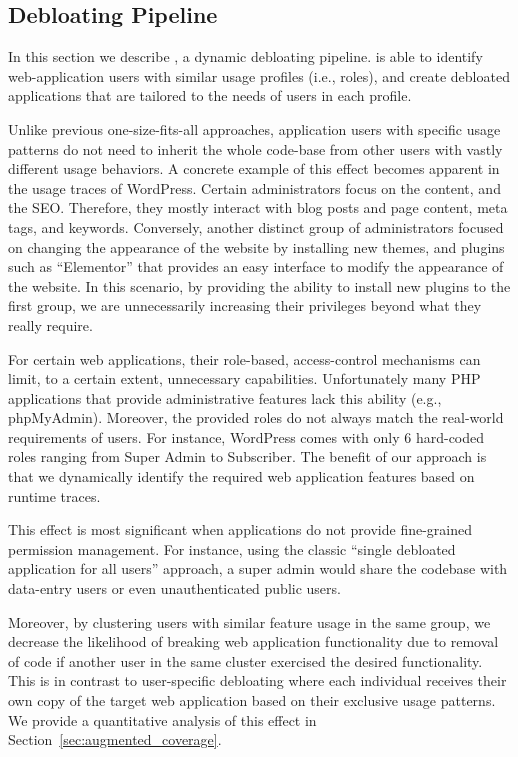 \subsection{Debloating Pipeline}

In this section we describe \sys{}, a dynamic debloating pipeline. 
\sys{} is able to identify web-application users with similar usage profiles (i.e., roles), and create debloated applications that are tailored to the needs of users in each profile. 


Unlike previous one-size-fits-all approaches, application users with specific usage patterns do not need to inherit the whole code-base from other users with vastly different usage behaviors. 
A concrete example of this effect becomes apparent in the usage traces of WordPress. 
Certain administrators focus on the content, and the SEO. 
Therefore, they mostly interact with blog posts and page content, meta tags, and keywords. 
Conversely, another distinct group of administrators focused on changing the appearance of the website by installing new themes, and plugins such as ``Elementor'' that provides an easy interface to modify the appearance of the website. 
In this scenario, by providing the ability to install new plugins to the first group, we are unnecessarily increasing their privileges beyond what they really require. 

For certain web applications, their role-based, access-control mechanisms can limit, to a certain extent, unnecessary capabilities.
Unfortunately many PHP applications that provide administrative features lack this ability (e.g., phpMyAdmin). 
Moreover, the provided roles do not always match the real-world requirements of users. For instance, WordPress comes with only 6 hard-coded roles ranging from Super Admin to Subscriber. 
The benefit of our approach is that we dynamically identify the required web application features based on runtime traces. 

This effect is most significant when applications do not provide fine-grained permission management. 
For instance, using the classic ``single debloated application for all users'' approach, a super admin would share the codebase with data-entry users or even unauthenticated public users. 

Moreover, by clustering users with similar feature usage in the same group, we decrease the likelihood of breaking web application functionality due to removal of code if another user in the same cluster exercised the desired functionality. 
This is in contrast to user-specific debloating where each individual receives their own copy of the target web application based on their exclusive usage patterns. 
We provide a quantitative analysis of this effect in Section~\ref{sec:augmented_coverage}.

